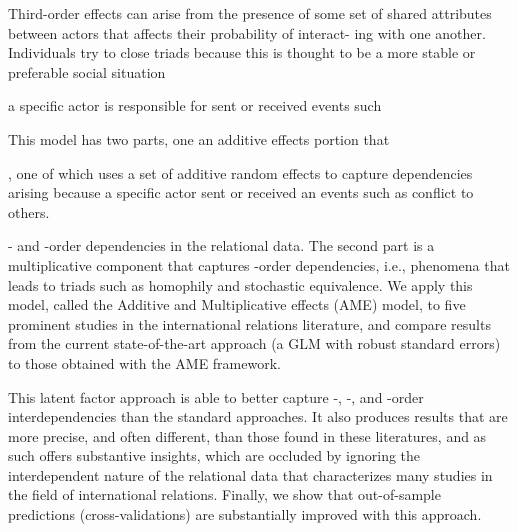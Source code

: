 Third-order effects can arise from the presence of some set of shared attributes between actors that affects their probability of interact- ing with one another. Individuals try to close triads because this is thought to be a more stable or preferable social situation

a specific actor is responsible for sent or received events such 

This model has two parts, one an additive effects portion that 

, one of which uses a set of additive random effects to capture dependencies arising because a specific actor sent or received an events such as conflict to others. 

\first- and \second-order dependencies in the relational data. The second part is a multiplicative component that captures \third-order dependencies, i.e., phenomena that leads to triads such as homophily and stochastic equivalence.  We apply this model, called the Additive and Multiplicative effects (AME) model, to five prominent studies in the international relations literature, and compare results from the current state-of-the-art approach (a GLM with robust standard errors) to those obtained with the AME framework. 

This latent factor approach is able to better capture \first-, \second-, and \third-order interdependencies than the standard approaches. It also produces results that are more precise, and often different, than those found in these literatures, and as such offers substantive insights, which are occluded by ignoring the interdependent nature of the relational data that characterizes many studies in the field of international relations. Finally, we show that out-of-sample  predictions (cross-validations) are substantially improved with this approach.  